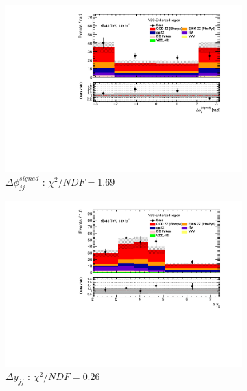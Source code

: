 \begin{figure}[!htb]
\begin{subfigure}{.49\textwidth}
        \centering
        \includegraphics[width=.98\linewidth]{figures/Results/RecoDist_VBSEnhanced/reco_dphi_SR.pdf}
        \caption{ \footnotesize{$\Delta \phi _{jj}^{signed}$ }: $\chi^2/NDF = 1.69$ }
    \end{subfigure}
    \begin{subfigure}{.49\textwidth}
        \centering
        \includegraphics[width=.98\linewidth]{figures/Results/RecoDist_VBSEnhanced/reco_dy_SR.pdf}
        \caption{ \footnotesize{$\Delta y_{jj}$ }: $\chi^2/NDF = 0.26$ }
    \end{subfigure}\\
    \begin{subfigure}{.49\textwidth}
        \centering

\end{subfigure}
\end{figure}
